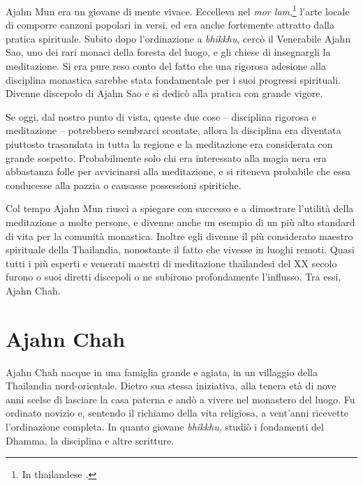 Ajahn Mun era un giovane di mente vivace. Eccelleva nel \emph{mor
lam},\footnote{In thailandese .} l'arte locale di comporre canzoni
popolari in versi, ed era anche fortemente attratto dalla pratica
spirituale. Subito dopo l'ordinazione a \emph{bhikkhu}, cercò il
Venerabile Ajahn Sao, uno dei rari monaci della foresta del luogo, e gli
chiese di insegnargli la meditazione. Si era pure reso conto del fatto
che una rigorosa adesione alla disciplina monastica sarebbe stata
fondamentale per i suoi progressi spirituali. Divenne discepolo di Ajahn
Sao e si dedicò alla pratica con grande vigore.

Se oggi, dal nostro punto di vista, queste due cose -- disciplina
rigorosa e meditazione -- potrebbero sembrarci scontate, allora la
disciplina era diventata piuttosto trasandata in tutta la regione e la
meditazione era considerata con grande sospetto. Probabilmente solo chi
era interessato alla magia nera era abbastanza folle per avvicinarsi
alla meditazione, e si riteneva probabile che essa conducesse alla
pazzia o causasse possessioni spiritiche.

Col tempo Ajahn Mun riuscì a spiegare con successo e a dimostrare
l'utilità della meditazione a molte persone, e divenne anche un esempio
di un più alto standard di vita per la comunità monastica. Inoltre egli
divenne il più considerato maestro spirituale della Thailandia,
nonostante il fatto che vivesse in luoghi remoti. Quasi tutti i più
esperti e venerati maestri di meditazione thailandesi del XX secolo
furono o suoi diretti discepoli o ne subirono profondamente l'influsso.
Tra essi, Ajahn Chah.

\section{Ajahn Chah}

Ajahn Chah nacque in una famiglia grande e agiata, in un villaggio della
Thailandia nord-orientale. Dietro sua stessa iniziativa, alla tenera età
di nove anni scelse di lasciare la casa paterna e andò a vivere nel
monastero del luogo. Fu ordinato novizio e, sentendo il richiamo della
vita religiosa, a vent'anni ricevette l'ordinazione completa. In quanto
giovane \emph{bhikkhu}, studiò i fondamenti del Dhamma, la disciplina e
altre scritture.

